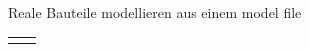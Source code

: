 \begin{frame}[t]{Reale Bauteile modellieren aus einem model file}
\begin{spacing}{0.9}
\begin{tiny}
\begin{table}[h!]
\begin{tabular}{p{5cm} p{5cm}}
\begin{minipage}{0.5\textwidth}
                    \end{minipage}
                \end{tabular}
            \end{table}
        \end{tiny} \end{spacing}
\end{frame}